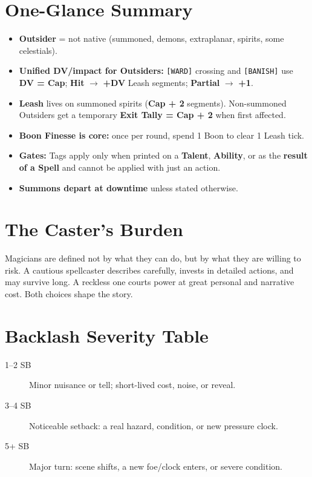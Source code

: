\section{One-Glance Summary}

\begin{itemize}
  \item \textbf{Outsider} = not native (summoned, demons, extraplanar, spirits, some celestials).
  \item \textbf{Unified DV/impact for Outsiders:} \texttt{[WARD]} crossing and \texttt{[BANISH]} use \textbf{DV = Cap}; \textbf{Hit} $\rightarrow$ \textbf{+DV} Leash segments; \textbf{Partial} $\rightarrow$ \textbf{+1}.
  \item \textbf{Leash} lives on summoned spirits (\textbf{Cap + 2} segments). Non-summoned Outsiders get a temporary \textbf{Exit Tally = Cap + 2} when first affected.
  \item \textbf{Boon Finesse is core:} once per round, spend 1 Boon to clear 1 Leash tick.
  \item \textbf{Gates:} Tags apply only when printed on a \textbf{Talent}, \textbf{Ability}, or as the \textbf{result of a Spell} and cannot be applied with just an action.
  \item \textbf{Summons depart at downtime} unless stated otherwise.
\end{itemize}

\section{The Caster's Burden}

Magicians are defined not by what they can do, but by what they are willing to risk. A cautious spellcaster describes carefully, invests in detailed actions, and may survive long. A reckless one courts power at great personal and narrative cost. Both choices shape the story.

\section{Backlash Severity Table}

\begin{description}
\item[1--2 SB] Minor nuisance or tell; short-lived cost, noise, or reveal.
\item[3--4 SB] Noticeable setback: a real hazard, condition, or new pressure clock.
\item[5+ SB] Major turn: scene shifts, a new foe/clock enters, or severe condition.
\end{description}


